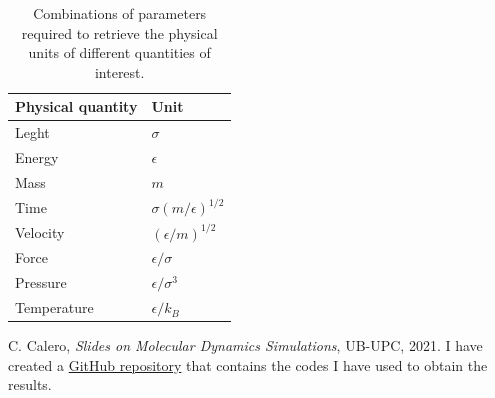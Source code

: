 \documentclass{article}
\begin{document}
  \begin{table}[htb]
    \centering
    \caption{Combinations of parameters required to retrieve the physical units of different quantities of interest.}\label{tab:units}
    \begin{tabular}{ll}\hline
      Physical quantity & Unit                         \\\hline\hline
      Leght             & \(\sigma\)                   \\
      Energy            & \(\epsilon\)                 \\
      Mass              & \(m\)                        \\
      Time              & \(\sigma(m/\epsilon)^{1/2}\) \\
      Velocity          & \((\epsilon/m)^{1/2}\)       \\
      Force             & \(\epsilon/\sigma\)          \\
      Pressure          & \(\epsilon/\sigma^{3}\)      \\
      Temperature       & \(\epsilon/k_{B}\)           \\\hline
    \end{tabular}
  \end{table}

  \begin{thebibliography}{99}
     C. Calero, {\em Slides on Molecular Dynamics Simulations}, UB-UPC, 2021.
     I have created a \href{https://github.com/AdriaMeca/Molecular-Dynamics-Simulations.git}{GitHub repository} that contains the codes I have used to obtain the results.
  \end{thebibliography}
\end{document}
